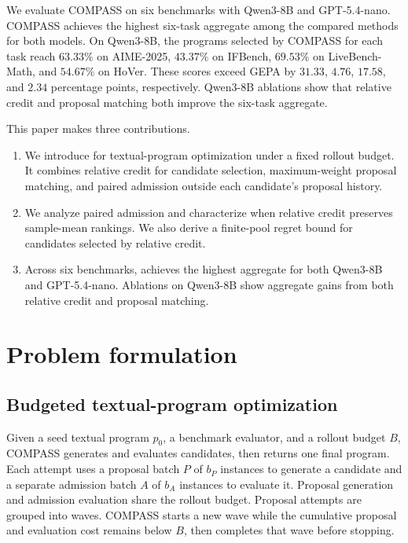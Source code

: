 We evaluate COMPASS on six benchmarks with Qwen3-8B and GPT-5.4-nano.  COMPASS
achieves the highest six-task aggregate among the compared methods for both
models.  On Qwen3-8B, the programs selected by COMPASS for each task reach $63.33\%$ on AIME-2025,
$43.37\%$ on IFBench, $69.53\%$ on LiveBench-Math, and $54.67\%$ on HoVer.
These scores exceed GEPA by $31.33$, $4.76$, $17.58$, and $2.34$
percentage points, respectively.  Qwen3-8B ablations show that relative credit
and proposal matching both improve the six-task aggregate.

This paper makes three contributions.
\begin{enumerate}[leftmargin=*,itemsep=2pt,topsep=3pt]
  \item We introduce \method{} for textual-program optimization under a fixed
  rollout budget.  It combines relative credit for candidate selection,
  maximum-weight proposal matching, and paired admission outside each
  candidate's proposal history.

  \item We analyze paired admission and characterize when relative credit
  preserves sample-mean rankings.  We also derive a finite-pool regret bound
  for candidates selected by relative credit.

  \item Across six benchmarks, \method{} achieves the highest aggregate for both
  Qwen3-8B and GPT-5.4-nano.  Ablations on Qwen3-8B show aggregate gains from
  both relative credit and proposal matching.
\end{enumerate}

\newpage
\section{Problem formulation}
\label{sec:setting}

\subsection{Budgeted textual-program optimization}

Given a seed textual program $p_0$, a benchmark evaluator, and a rollout
budget $B$, COMPASS generates and evaluates candidates, then returns one final
program.  Each attempt uses a proposal batch $P$ of
$b_P$ instances to generate a candidate and a separate admission batch $A$ of
$b_A$ instances to evaluate it.  Proposal generation and admission evaluation
share the rollout budget.  Proposal attempts are grouped into waves.
COMPASS starts a new wave while the cumulative
proposal and evaluation cost remains below $B$, then completes that wave before
stopping.

